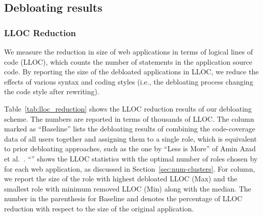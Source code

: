 
\subsection{Debloating results}

\subsubsection{LLOC Reduction}
 
We measure the reduction in size of web applications in terms of logical lines of code (LLOC), which counts the number of statements in the application source code. 
By reporting the size of the debloated applications in LLOC, we reduce the effects of various syntax and coding styles (i.e., the debloating process changing the code style after rewriting). 

Table~\ref{tab:lloc_reduction} shows the LLOC reduction results of our debloating scheme. 
The numbers are reported in terms of thousands of LLOC. 
The column marked as ``Baseline'' lists the debloating results of combining the code-coverage data of all users together and assigning them to a single role, which is equivalent to prior debloating approaches, such as the one by ``Less is More'' of Amin Azad et al.~\cite{lessismore}.
``\dbltr{}'' shows the LLOC statistics with the optimal number of roles chosen by \dbltr{} for each web application, as discussed in Section~\ref{sec:num-clusters}. 
For \dbltr{} column, we report the size of the role with highest debloated LLOC (Max) and the smallest role with minimum removed LLOC (Min) along with the median. 
The number in the parenthesis for Baseline and \dbltr{} denotes the percentage of LLOC reduction with respect to the size of the original application. 

